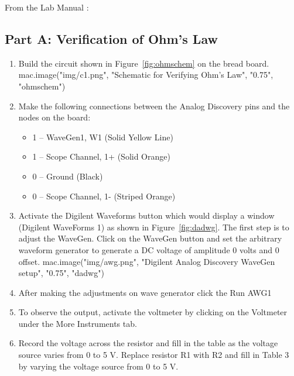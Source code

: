 {%

From the Lab Manual \cite{manual} :
\subsection{Part A: Verification of Ohm's Law}
\label{sub:Procedure Part A}
\begin{enumerate}
  \item Build the circuit shown in Figure~\ref{fig:ohmschem}  on the bread board.
  {{ mac.image("img/c1.png", "Schematic for Verifying Ohm's Law", "0.75", "ohmschem")}}
  \item Make the following connections between the Analog Discovery pins and the nodes on the
  board:
  \begin{itemize}
    \item 1 – WaveGen1, W1 (Solid Yellow Line)
    \item 1 – Scope Channel, 1+ (Solid Orange)
    \item 0 – Ground (Black)
    \item 0 – Scope Channel, 1- (Striped Orange)
  \end{itemize}

  \item Activate the Digilent Waveforms button which would display a window (Digilent
  WaveForms 1) as shown in Figure~\ref{fig:dadwg}. The first step is to adjust the WaveGen.
  Click on the WaveGen button and set the arbitrary waveform generator to generate a DC
  voltage of amplitude 0 volts and 0 offset.
  {{ mac.image("img/awg.png", "Digilent Analog Discovery WaveGen setup", "0.75", "dadwg")}}


  \item After making the adjustments on wave generator click the Run AWG1
  \item To observe the output, activate the voltmeter by clicking on the Voltmeter under the
  More Instruments tab.
  \item Record the voltage across the resistor and fill in the table as the voltage source varies from
  0 to 5 V. Replace resistor R1 with R2 and fill in Table 3 by varying the voltage source from 0 to 5
  V.
\end{enumerate}
\vspace{1cm}

}
